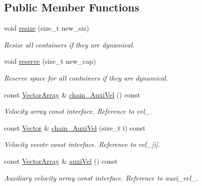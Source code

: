 \subsection*{Public Member Functions}
\begin{DoxyCompactItemize}
\item 
void \mbox{\hyperlink{class_space_h_1_1_vel_dep_chain_particles_a8cc7751b890724be0bf72471cb65d761}{resize}} (size\+\_\+t new\+\_\+siz)
\begin{DoxyCompactList}\small\item\em Resize all containers if they are dynamical. \end{DoxyCompactList}\item 
void \mbox{\hyperlink{class_space_h_1_1_vel_dep_chain_particles_a0257a89d0e3058624cc076c2956b94ea}{reserve}} (size\+\_\+t new\+\_\+cap)
\begin{DoxyCompactList}\small\item\em Reserve space for all containers if they are dynamical. \end{DoxyCompactList}\item 
const \mbox{\hyperlink{class_space_h_1_1_vel_indep_particles_aa9983058940249df8b00fa800e8cbad2}{Vector\+Array}} \& \mbox{\hyperlink{class_space_h_1_1_vel_dep_chain_particles_ab2ec7493ee6cb12ed77f6aac4f4e8660}{chain_\+Auxi\+Vel}} () const
\begin{DoxyCompactList}\small\item\em Velocity array const interface. Reference to vel\+\_\+. \end{DoxyCompactList}\item 
const \mbox{\hyperlink{class_space_h_1_1_vel_indep_particles_a61bbcfdb0dc7f99f3c68af69a755c935}{Vector}} \& \mbox{\hyperlink{class_space_h_1_1_vel_dep_chain_particles_a1f717dd8619e3237362bacd55623500c}{chain_\+Auxi\+Vel}} (size\+\_\+t i) const
\begin{DoxyCompactList}\small\item\em Velocity vecotr const interface. Reference to vel\+\_\+\mbox{[}i\mbox{]}. \end{DoxyCompactList}\item 
const \mbox{\hyperlink{class_space_h_1_1_vel_indep_particles_aa9983058940249df8b00fa800e8cbad2}{Vector\+Array}} \& \mbox{\hyperlink{class_space_h_1_1_vel_dep_chain_particles_a36387410e94b04978444b572da9f9104}{auxi\+Vel}} () const
\begin{DoxyCompactList}\small\item\em Auxiliary velocity array const interface. Reference to auxi\+\_\+vel\+\_\+. \end{DoxyCompactList}\item 

\end{DoxyCompactItemize}
